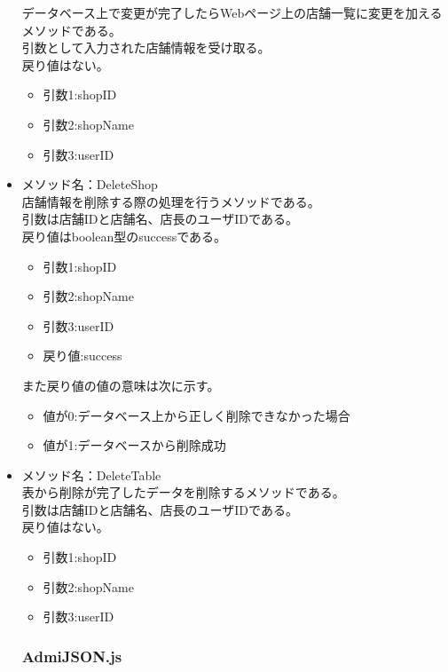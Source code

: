 \documentclass[a4j]{jarticle}
\begin{document}
\begin{itemize}
データベース上で変更が完了したらWebページ上の店舗一覧に変更を加えるメソッドである。\\
引数として入力された店舗情報を受け取る。\\
戻り値はない。

	\begin{itemize}
		\item 引数1:shopID
		\item 引数2:shopName
		\item 引数3:userID
	\end{itemize}

\item メソッド名：DeleteShop\\

店舗情報を削除する際の処理を行うメソッドである。\\
引数は店舗IDと店舗名、店長のユーザIDである。\\
戻り値はboolean型のsuccessである。

	\begin{itemize}
		\item 引数1:shopID
		\item 引数2:shopName
		\item 引数3:userID
		\item 戻り値:success
	\end{itemize}
また戻り値の値の意味は次に示す。
	\begin{itemize}
		\item 値が0:データベース上から正しく削除できなかった場合
		\item 値が1:データベースから削除成功
	\end{itemize}

\item メソッド名：DeleteTable\\

表から削除が完了したデータを削除するメソッドである。\\
引数は店舗IDと店舗名、店長のユーザIDである。\\
戻り値はない。
	\begin{itemize}
		\item 引数1:shopID
		\item 引数2:shopName
		\item 引数3:userID
	\end{itemize}
\subsubsection{AdmiJSON.js}


\end{itemize}
\end{document}
